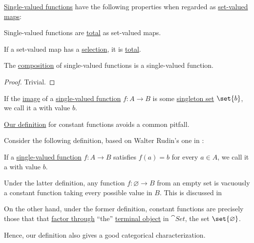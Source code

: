 \begin{proposition}\label{thm:def:function}
  \hyperref[def:function]{Single-valued functions} have the following properties when regarded as \hyperref[def:function]{set-valued maps}:
  \begin{thmenum}
     Single-valued functions are \hyperref[def:set_valued_map/partial]{total} as set-valued maps.

     If a set-valued map has a \hyperref[def:function/selection]{selection}, it is \hyperref[def:set_valued_map/partial]{total}.

     The \hyperref[def:set_valued_map/composition]{composition} of single-valued functions is a single-valued function.
  \end{thmenum}
\end{proposition}
\begin{proof}
  Trivial.
\end{proof}

\begin{definition}\label{def:indicator_function}
\end{definition}

\begin{definition}\label{def:constant_function}\mimprovised
  If the \hyperref[def:set_valued_map/image]{image} of a \hyperref[def:function]{single-valued function} \( f: A \to B \) is some \hyperref[def:subsingleton_set]{singleton set} \( \set{ b } \), we call it a  with value \( b \).
\end{definition}

\begin{remark}\label{rem:constant_function}
  \hyperref[def:constant_function]{Our definition} for constant functions avoids a common pitfall.

  Consider the following definition, based on Walter Rudin's one in \cite[def. 4.3]{Rudin1976AnalysisPrinciples}:
  \begin{displayquote}
    If a \hyperref[def:function]{single-valued function} \( f: A \to B \) satisfies \( f(a) = b \) for every \( a \in A \), we call it a  with value \( b \).
  \end{displayquote}

  Under the latter definition, any function \( f: \varnothing \to B \) from an empty set is vacuously a constant function taking every possible value in \( B \). This is discussed in

  On the other hand, under the former definition, constant functions are precisely those that that \hyperref[def:factors_through]{factor through} \enquote{the} \hyperref[def:universal_objects/terminal]{terminal object} in \hyperref[def:category_of_small_sets]{\( \cat{Set} \)}, the set \( \set{ \varnothing } \).

  Hence, our definition also gives a good categorical characterization.
\end{remark}

